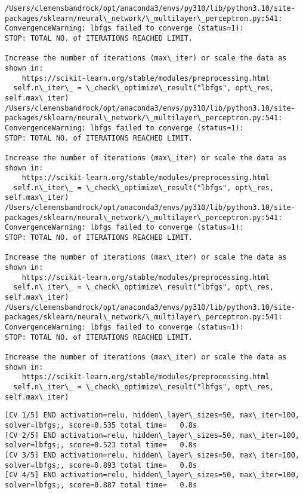 \documentclass[11pt]{article}
\begin{document}
    \begin{Verbatim}[commandchars=\\\{\}]
/Users/clemensbandrock/opt/anaconda3/envs/py310/lib/python3.10/site-
packages/sklearn/neural\_network/\_multilayer\_perceptron.py:541:
ConvergenceWarning: lbfgs failed to converge (status=1):
STOP: TOTAL NO. of ITERATIONS REACHED LIMIT.

Increase the number of iterations (max\_iter) or scale the data as shown in:
    https://scikit-learn.org/stable/modules/preprocessing.html
  self.n\_iter\_ = \_check\_optimize\_result("lbfgs", opt\_res, self.max\_iter)
/Users/clemensbandrock/opt/anaconda3/envs/py310/lib/python3.10/site-
packages/sklearn/neural\_network/\_multilayer\_perceptron.py:541:
ConvergenceWarning: lbfgs failed to converge (status=1):
STOP: TOTAL NO. of ITERATIONS REACHED LIMIT.

Increase the number of iterations (max\_iter) or scale the data as shown in:
    https://scikit-learn.org/stable/modules/preprocessing.html
  self.n\_iter\_ = \_check\_optimize\_result("lbfgs", opt\_res, self.max\_iter)
/Users/clemensbandrock/opt/anaconda3/envs/py310/lib/python3.10/site-
packages/sklearn/neural\_network/\_multilayer\_perceptron.py:541:
ConvergenceWarning: lbfgs failed to converge (status=1):
STOP: TOTAL NO. of ITERATIONS REACHED LIMIT.

Increase the number of iterations (max\_iter) or scale the data as shown in:
    https://scikit-learn.org/stable/modules/preprocessing.html
  self.n\_iter\_ = \_check\_optimize\_result("lbfgs", opt\_res, self.max\_iter)
/Users/clemensbandrock/opt/anaconda3/envs/py310/lib/python3.10/site-
packages/sklearn/neural\_network/\_multilayer\_perceptron.py:541:
ConvergenceWarning: lbfgs failed to converge (status=1):
STOP: TOTAL NO. of ITERATIONS REACHED LIMIT.

Increase the number of iterations (max\_iter) or scale the data as shown in:
    https://scikit-learn.org/stable/modules/preprocessing.html
  self.n\_iter\_ = \_check\_optimize\_result("lbfgs", opt\_res, self.max\_iter)
    \end{Verbatim}

    \begin{Verbatim}[commandchars=\\\{\}]
[CV 1/5] END activation=relu, hidden\_layer\_sizes=50, max\_iter=100,
solver=lbfgs;, score=0.535 total time=   0.8s
[CV 2/5] END activation=relu, hidden\_layer\_sizes=50, max\_iter=100,
solver=lbfgs;, score=0.523 total time=   0.8s
[CV 3/5] END activation=relu, hidden\_layer\_sizes=50, max\_iter=100,
solver=lbfgs;, score=0.893 total time=   0.8s
[CV 4/5] END activation=relu, hidden\_layer\_sizes=50, max\_iter=100,
solver=lbfgs;, score=0.887 total time=   0.8s
    \end{Verbatim}
\end{document}
